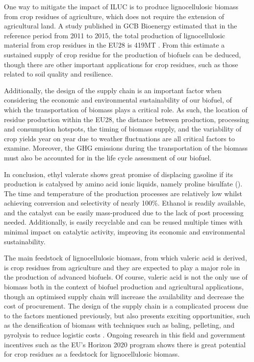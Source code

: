 One way to mitigate the impact of ILUC is to produce lignocellulosic biomass from crop residues of agriculture, which does not require the extension of agricultural land. A study published in GCB Bioenergy estimated that in the reference period from 2011 to 2015, the total production of lignocellulosic material from crop residues in the EU28 is 419MT \cite{q7-r3}. From this estimate a sustained supply of crop residue for the production of biofuels can be deduced, though there are other important applications for crop residues, such as those related to soil quality and resilience.

Additionally, the design of the supply chain is an important factor when considering the economic and environmental sustainability of our biofuel, of which the transportation of biomass plays a critical role. As such, the location of residue production within the EU28, the distance between production, processing and consumption hotspots, the timing of biomass supply, and the variability of crop yields year on year due to weather fluctuations are all critical factors to examine. Moreover, the GHG emissions during the transportation of the biomass must also be accounted for in the life cycle assessment of our biofuel.

In conclusion, ethyl valerate shows great promise of displacing gasoline if its production is catalysed by amino acid ionic liquids, namely proline bisulfate (). The time and temperature of the production processes are relatively low whilst achieving conversion and selectivity of nearly 100\%. Ethanol is readily available, and the catalyst can be easily mass-produced due to the lack of post processing needed. Additionally,  is easily recyclable and can be reused multiple times with minimal impact on catalytic activity, improving its economic and environmental sustainability.

The main feedstock of lignocellulosic biomass, from which valeric acid is derived, is crop residues from agriculture and they are expected to play a major role in the production of advanced biofuels. Of course, valeric acid is not the only use of biomass both in the context of biofuel production and agricultural applications, though an optimised supply chain will increase the availability and decrease the cost of procurement. The design of the supply chain is a complicated process due to the factors mentioned previously, but also presents exciting opportunities, such as the densification of biomass with techniques such as baling, pelleting, and pyrolysis to reduce logistic costs \cite{q7-r4}. Ongoing research in this field and government incentives such as the EU’s Horizon 2020 program shows there is great potential for crop residues as a feedstock for lignocellulosic biomass.
